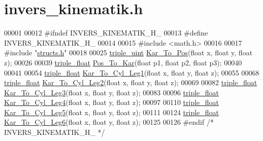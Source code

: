 \hypertarget{invers__kinematik_8h_source}{}\section{invers\+\_\+kinematik.\+h}
\label{invers__kinematik_8h_source}

\begin{DoxyCode}
00001 
00012 \textcolor{preprocessor}{#ifndef INVERS\_KINEMATIK\_H\_}
00013 \textcolor{preprocessor}{#define INVERS\_KINEMATIK\_H\_}
00014 
00015 \textcolor{preprocessor}{#include <math.h>}
00016 
00017 \textcolor{preprocessor}{#include "\hyperlink{structs_8h}{structs.h}"}
00018 
00025 \hyperlink{structtriple__uint}{triple\_uint} \hyperlink{invers__kinematik_8h_a68f82386196ad991ed54fb9796d90f7c}{Kar\_To\_Pos}(\textcolor{keywordtype}{float} x, \textcolor{keywordtype}{float} y, \textcolor{keywordtype}{float} z);
00026 
00039 \hyperlink{structtriple__float}{triple\_float} \hyperlink{invers__kinematik_8h_ae80254627d743b6d24dbe47cd75adc7e}{Pos\_To\_Kar}(\textcolor{keywordtype}{float} p1, \textcolor{keywordtype}{float} p2, \textcolor{keywordtype}{float} p3);
00040 
00041 
00054 \hyperlink{structtriple__float}{triple\_float} \hyperlink{invers__kinematik_8h_ae696af5df234c2f15694317bcf2a4bec}{Kar\_To\_Cyl\_Leg1}(\textcolor{keywordtype}{float} x, \textcolor{keywordtype}{float} y, \textcolor{keywordtype}{float} z);
00055 
00068 \hyperlink{structtriple__float}{triple\_float} \hyperlink{invers__kinematik_8h_addfbc7c7fdb83567e74239fb6333d92c}{Kar\_To\_Cyl\_Leg2}(\textcolor{keywordtype}{float} x, \textcolor{keywordtype}{float} y, \textcolor{keywordtype}{float} z);
00069 
00082 \hyperlink{structtriple__float}{triple\_float} \hyperlink{invers__kinematik_8h_a60f2e45cc22b107f9c5020ca85c6ab31}{Kar\_To\_Cyl\_Leg3}(\textcolor{keywordtype}{float} x, \textcolor{keywordtype}{float} y, \textcolor{keywordtype}{float} z);
00083 
00096 \hyperlink{structtriple__float}{triple\_float} \hyperlink{invers__kinematik_8h_aaaaddfbb21d42ca2d7f2ff855a3b1a01}{Kar\_To\_Cyl\_Leg4}(\textcolor{keywordtype}{float} x, \textcolor{keywordtype}{float} y, \textcolor{keywordtype}{float} z);
00097 
00110 \hyperlink{structtriple__float}{triple\_float} \hyperlink{invers__kinematik_8h_abc3e6e1ada8dc2e48c5b0dc980c0dc81}{Kar\_To\_Cyl\_Leg5}(\textcolor{keywordtype}{float} x, \textcolor{keywordtype}{float} y, \textcolor{keywordtype}{float} z);
00111 
00124 \hyperlink{structtriple__float}{triple\_float} \hyperlink{invers__kinematik_8h_aac6d276df2445e288447c993547ecbc4}{Kar\_To\_Cyl\_Leg6}(\textcolor{keywordtype}{float} x, \textcolor{keywordtype}{float} y, \textcolor{keywordtype}{float} z);
00125 
00126 \textcolor{preprocessor}{#endif }\textcolor{comment}{/* INVERS\_KINEMATIK\_H\_ */}\textcolor{preprocessor}{}
\end{DoxyCode}
